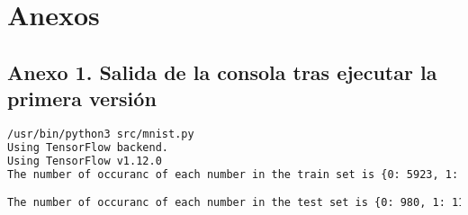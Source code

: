 \chapter{Anexos}
\label{chap:anexos}

\section{Anexo 1. Salida de la consola tras ejecutar la primera versión}
\label{sec:v1-output}

\begin{lstlisting}[language=bash]
/usr/bin/python3 src/mnist.py
Using TensorFlow backend.
Using TensorFlow v1.12.0
The number of occuranc of each number in the train set is {0: 5923, 1: 6742, 2: 5958, 3: 6131, 4: 5842, 5: 5421, 6: 5918, 7: 6265, 8: 5851, 9: 5949}

The number of occuranc of each number in the test set is {0: 980, 1: 1135, 2: 1032, 3: 1010, 4: 982, 5: 892, 6: 958, 7: 1028, 8: 974, 9: 1009}


\end{lstlisting}
